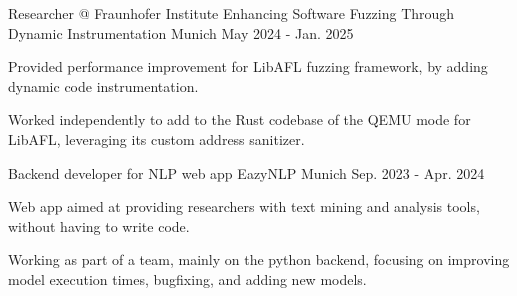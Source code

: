 

\begin{cventries}

  \cventry
    {Researcher @ Fraunhofer Institute} %
    {Enhancing Software Fuzzing Through Dynamic Instrumentation} %
    {Munich} %
    {May 2024 - Jan. 2025} %
    {
      \begin{cvitems} %
        \item {Provided performance improvement for LibAFL fuzzing framework, by adding dynamic code instrumentation.}
        \item {Worked independently to add to the Rust codebase of the QEMU mode for LibAFL, leveraging its custom address sanitizer.}
      \end{cvitems}
    }

  \cventry
    {Backend developer for NLP web app} %
    {EazyNLP} %
    {Munich} %
    {Sep. 2023 - Apr. 2024} %
    {
      \begin{cvitems} %
        \item {Web app aimed at providing researchers with text mining and analysis tools, without having to write code.}
        \item {Working as part of a team, mainly on the python backend, focusing on improving model execution times, bugfixing, and adding new models.}
      \end{cvitems}
    }

\end{cventries}
